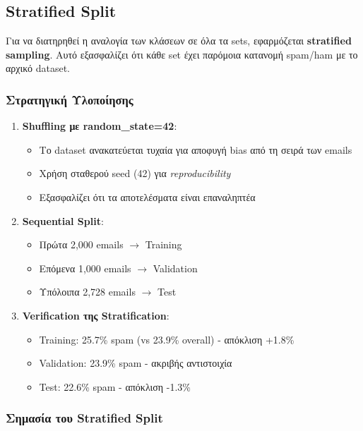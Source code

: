 \documentclass[12pt,a4paper,twoside]{book}
\begin{document}
\subsection{Stratified Split}

Για να διατηρηθεί η αναλογία των κλάσεων σε όλα τα sets, εφαρμόζεται \textbf{stratified sampling}. Αυτό εξασφαλίζει ότι κάθε set έχει παρόμοια κατανομή spam/ham με το αρχικό dataset.

\subsubsection*{Στρατηγική Υλοποίησης}

\begin{enumerate}
    \item \textbf{Shuffling με random\_state=42}:
          \begin{itemize}
              \item Το dataset ανακατεύεται τυχαία για αποφυγή bias από τη σειρά των emails
              \item Χρήση σταθερού seed (42) για \textit{reproducibility}
              \item Εξασφαλίζει ότι τα αποτελέσματα είναι επαναληπτέα
          \end{itemize}

    \item \textbf{Sequential Split}:
          \begin{itemize}
              \item Πρώτα 2,000 emails \(\rightarrow\) Training
              \item Επόμενα 1,000 emails \(\rightarrow\) Validation
              \item Υπόλοιπα 2,728 emails \(\rightarrow\) Test
          \end{itemize}

    \item \textbf{Verification της Stratification}:
          \begin{itemize}
              \item Training: 25.7\% spam (vs 23.9\% overall) - απόκλιση +1.8\%
              \item Validation: 23.9\% spam - ακριβής αντιστοιχία
              \item Test: 22.6\% spam - απόκλιση -1.3\%
          \end{itemize}
\end{enumerate}

\subsubsection*{Σημασία του Stratified Split}
\end{document}
